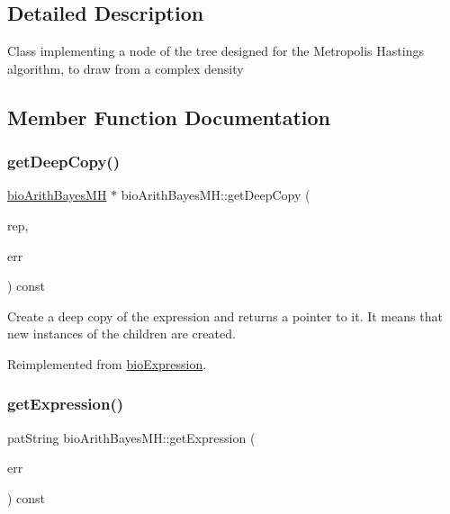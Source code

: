 \subsection{Detailed Description}
Class implementing a node of the tree designed for the Metropolis Hastings algorithm, to draw from a complex density 

\subsection{Member Function Documentation}
\mbox{\label{classbio_arith_bayes_m_h_a4477bd620cc50e05a248df51e8c74ad6}} 
\subsubsection{\texorpdfstring{get\+Deep\+Copy()}{getDeepCopy()}}
{\footnotesize\ttfamily \hyperlink{classbio_arith_bayes_m_h}{bio\+Arith\+Bayes\+MH} $\ast$ bio\+Arith\+Bayes\+M\+H\+::get\+Deep\+Copy (\begin{DoxyParamCaption}\item[{\hyperlink{classbio_expression_repository}{bio\+Expression\+Repository} $\ast$}]{rep,  }\item[{pat\+Error $\ast$\&}]{err }\end{DoxyParamCaption}) const\hspace{0.3cm}{\ttfamily [virtual]}}

Create a deep copy of the expression and returns a pointer to it. It means that new instances of the children are created. 

Reimplemented from \hyperlink{classbio_expression_a4ee1b8add634078a02eaae26cd40dcc8}{bio\+Expression}.

\mbox{\label{classbio_arith_bayes_m_h_a7579a02175af9bde0e35c0548a6740bd}} 
\subsubsection{\texorpdfstring{get\+Expression()}{getExpression()}}
{\footnotesize\ttfamily pat\+String bio\+Arith\+Bayes\+M\+H\+::get\+Expression (\begin{DoxyParamCaption}\item[{pat\+Error $\ast$\&}]{err }\end{DoxyParamCaption}) const\hspace{0.3cm}{\ttfamily [virtual]}}

